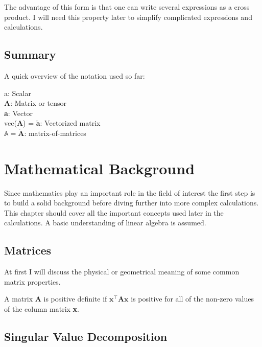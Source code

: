 The advantage of this form is that one can write several expressions as a cross product. I will need this property later to simplify complicated expressions and calculations.


\subsection{Summary}
A quick overview of the notation used so far:

\begin{addmargin}[1cm]{1cm}
a: Scalar \\
\textbf{A}: Matrix or tensor \\
\textbf{a}: Vector \\
vec(\textbf{A}) = $\mathbf{\check{a}}$: Vectorized matrix \\
$\mathbb{A} = \mathbf{\check{A}}$: matrix-of-matrices
\end{addmargin}




\section{Mathematical Background}
Since mathematics play an important role in the field of interest the first step is to build a solid background before diving further into more complex calculations. This chapter should cover all the important concepts used later in the calculations. A basic understanding of linear algebra is assumed.


\subsection{Matrices}
At first I will discuss the physical or geometrical meaning of some common matrix properties.

A matrix \textbf{A} is positive definite if $\textbf{x}^\intercal \textbf{Ax}$ is positive for all of the non-zero values of the column matrix \textbf{x}.



\subsection{Singular Value Decomposition}

